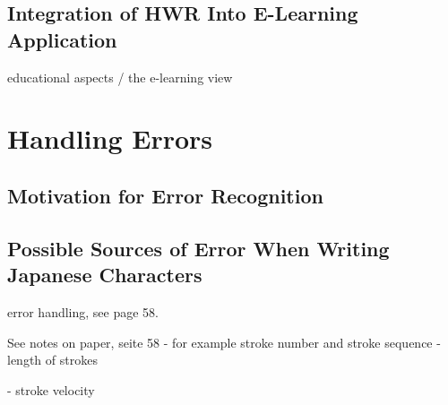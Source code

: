 \subsection{Integration of HWR Into E-Learning Application}
educational aspects / the e-learning view

\section{Handling Errors}
\label{sec:concept:handlingerrors}



\subsection{Motivation for Error Recognition}
\label{sec:concept:motivationforerrorrecognition}


\subsection[Sources of Error]{Possible Sources of Error When Writing Japanese Characters}
\label{sec:concept:sourcesoferror}

error handling, see page 58.


See notes on paper, seite 58
- for example stroke number and stroke sequence
- length of strokes

- stroke velocity